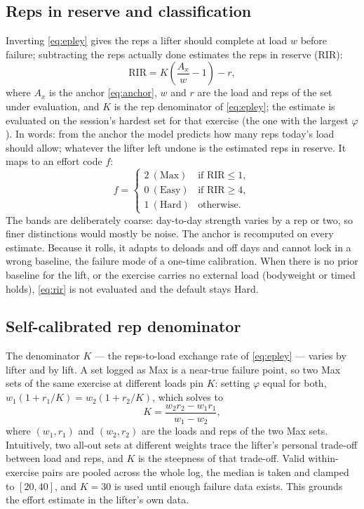 \documentclass[11pt,a4paper]{article}
\newcommand{\rir}{\mathrm{RIR}}
\begin{document}
\subsection{Reps in reserve and classification}
Inverting \eqref{eq:epley} gives the reps a lifter should complete at load $w$ before failure; subtracting the reps actually done estimates the reps in reserve (RIR):
\begin{equation}\label{eq:rir}
\rir=K\left(\frac{A_x}{w}-1\right)-r,
\end{equation}
where $A_x$ is the anchor \eqref{eq:anchor}, $w$ and $r$ are the load and reps of the set under evaluation, and $K$ is the rep denominator of \eqref{eq:epley}; the estimate is evaluated on the session's hardest set for that exercise (the one with the largest $\varphi$). In words: from the anchor the model predicts how many reps today's load should allow; whatever the lifter left undone is the estimated reps in reserve. It maps to an effort code $f$:
\begin{equation}\label{eq:fmap}
f=
\begin{cases}
2\ (\text{Max}) & \text{if } \rir \leq 1,\\
0\ (\text{Easy}) & \text{if } \rir \geq 4,\\
1\ (\text{Hard}) & \text{otherwise.}
\end{cases}
\end{equation}
The bands are deliberately coarse: day-to-day strength varies by a rep or two, so finer distinctions would mostly be noise. The anchor is recomputed on every estimate. Because it rolls, it adapts to deloads and off days and cannot lock in a wrong baseline, the failure mode of a one-time calibration. When there is no prior baseline for the lift, or the exercise carries no external load (bodyweight or timed holds), \eqref{eq:rir} is not evaluated and the default stays Hard.

\subsection{Self-calibrated rep denominator}\label{sec:kcal}
The denominator $K$ --- the reps-to-load exchange rate of \eqref{eq:epley} --- varies by lifter and by lift. A set logged as Max is a near-true failure point, so two Max sets of the same exercise at different loads pin $K$: setting $\varphi$ equal for both, $w_1(1+r_1/K)=w_2(1+r_2/K)$, which solves to
\begin{equation}\label{eq:kcal}
K=\frac{w_2 r_2 - w_1 r_1}{w_1 - w_2},
\end{equation}
where $(w_1,r_1)$ and $(w_2,r_2)$ are the loads and reps of the two Max sets. Intuitively, two all-out sets at different weights trace the lifter's personal trade-off between load and reps, and $K$ is the steepness of that trade-off. Valid within-exercise pairs are pooled across the whole log, the median is taken and clamped to $[20,40]$, and $K=30$ is used until enough failure data exists. This grounds the effort estimate in the lifter's own data.
\end{document}
